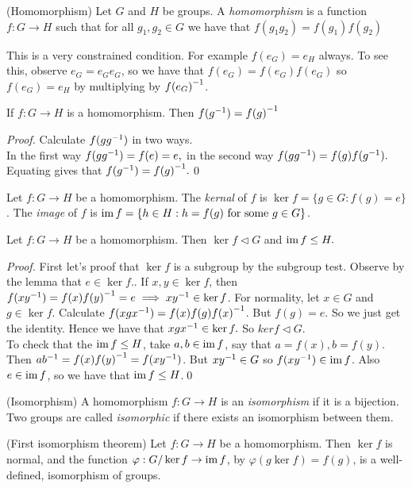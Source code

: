 \documentclass{article}
\newcommand{\nrm}{\triangleleft}
\begin{document}
\begin{itemize}
\begin{definition}
	(Homomorphism) Let $ G $ and $ H $ be groups. A \textit{homomorphism} is a function $ f: G\rightarrow H $ such that for all $ g_1,g_2\in G $ we have that $ f(g_1g_2)=f(g_1)f(g_2) $
\end{definition}
This is a very constrained condition. For example $ f(e_G)=e_H $ always. To see this, observe $ e_G=e_Ge_G $, so we have that $ f(e_G)=f(e_G)f(e_G) $ so $ f(e_G)=e_H $ by multiplying by $ {f(e_G)}^{-1} $.
\begin{lemma}
	If $ f:G\rightarrow H $ is a homomorphism. Then $ f({g}^{-1})={f(g)}^{-1} $
\end{lemma}
\textit{Proof.} Calculate $ f(g{g}^{-1}) $ in two ways.\\
	In the first way $ f(g{g}^{-1})=f(e)=e, $ in the second way $ f(g{g}^{-1})=f(g)f({g}^{-1}). $\\
Equating gives that $ f({g}^{-1})={f(g)}^{-1}. $\qed
\begin{definition}
	Let $ f:G\rightarrow H $ be a homomorphism. The \textit{kernal} of $ f $ is $ \ker f =\{g\in G: f(g)=e\} $. The \textit{image} of $ f $ is $ \operatorname{im} f=\{ h\in H: h=f(g)\text{ for some } g\in G\} $.
	\end{definition}
\begin{proposition}
	Let $ f:G\rightarrow H $ be a homomorphism. Then $ \ker f \triangleleft G $ and $ \operatorname{im} f \le H.$
\end{proposition}
\textit{Proof.} First let's proof that $ \ker f $ is a subgroup by the subgroup test. Observe by the lemma that $ e\in\ker f. $. If $ x,y \in\ker f $, then $ f(x{y}^{-1})=f(x){f(y)}^{-1}=e\implies x{y}^{-1}\in \ker f $. For normality, let $ x\in G $ and $ g\in\ker f $. Calculate $ f(xg{x}^{-1})=f(x)f(g){f(x)}^{-1} $. But $ f(g)=e $. So we just get the identity. Hence we have that $ xg{x}^{-1}\in\ker f. $ So $ ker f\nrm G $.\\
	To check that the $ \operatorname{im} f \le H $, take $ a,b\in \operatorname{im} f $, say that $ a=f(x), b=f(y) $. Then $ a{b}^{-1}=f(x){f(y)}^{-1}=f(x{y}^{-1}) $. But $ x{y}^{-1}\in G $ so $ f(x{y}^{-1})\in \operatorname{im} f $. Also $ e\in \operatorname{im} f $, so we have that $ \operatorname{im} f\le H $.\qed
\begin{definition}
	(Isomorphism) A homomorphism $ f:G\rightarrow H $ is an \textit{isomorphism} if it is a bijection. Two groups are called \textit{isomorphic} if there exists an isomorphism between them.
\end{definition}
\begin{theorem}
	(First isomorphism theorem) Let $ f:G\to H $ be a homomorphism. Then $ \ker f $ is normal, and the function $ \varphi:G/\ker f\rightarrow \operatorname{im} f $, by $ \varphi(g\ker f)=f(g) $, is a well-defined, isomorphism of groups.

\end{theorem}
\end{itemize}
\end{document}
